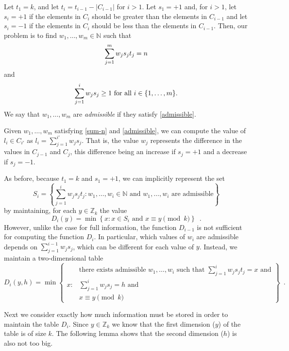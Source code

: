 \documentclass[lotsofwhite]{patmorin}
\newcommand{\Z}{\mathbb{Z}}
\newcommand{\N}{\mathbb{N}}
\begin{document}
Let $t_1=k$, and let $t_i = t_{i-1}-|C_{i-1}|$ for $i>1$.  Let
$s_1=+1$ and, for $i>1$, let $s_i=+1$ if the elements in $C_{i}$
should be greater than the elements in $C_{i-1}$ and let $s_{i}=-1$ if
the elements in $C_{i}$ should be less than the elements in $C_{i-1}$.
Then, our problem is to find $w_1,\ldots,w_m\in\N$ such
that
\begin{equation}
\sum_{j=1}^m w_js_jt_j = n \eqlabel{sum-n}
\end{equation}
and
\begin{equation}
\sum_{j=1}^i w_js_j \ge 1 \mbox{ for all $i\in\{1,\ldots,m\}$.}
\eqlabel{admissible}
\end{equation}
We say that $w_1,\ldots,w_m$ are \emph{admissible} if they satisfy
\eqref{admissible}.

Given $w_1,\ldots,w_m$ satisfying \eqref{sum-n} and
\eqref{admissible}, we can compute the value of $l_i\in C_{i'}$ as 
$l_i =\sum_{j=1}^{i'} w_js_j$.  That is, the value $w_j$ represents the
difference in the values in $C_{j-1}$ and $C_j$, this difference being
an increase if $s_j=+1$ and a decrease if $s_j=-1$.

As before, because $t_1=k$ and $s_1=+1$, we can implicitly represent
the set 
\[
   S_i = \left\{\sum_{j=1}^i w_js_jt_j : 
	\mbox{$w_1,\ldots,w_i\in\mathbb{N}$ and  
		$w_1,\ldots,w_i$ are admissible} \right\}
\]
by maintaining, for each $y\in \Z_k$ the value 
\[
   D_i(y) = \min\left\{x : \mbox{$x\in S_i$ and $x\equiv y\pmod{k}$} \right\}
    \enspace .
\]
However, unlike the case for full information, the function $D_{i-1}$
is not sufficient for computing the function $D_{i}$.  In particular,
which values of $w_i$ are admissible depends on
$\sum_{j=1}^{i-1}w_js_j$, which can be different for each value of $y$.
Instead, we maintain a two-dimensional table
\[
   D_i(y,h) = \min\left\{
    \begin{array}{ll}
          & \mbox{there exists admissible $w_1,\ldots,w_i$ such that
                                      $\sum_{j=1}^i w_js_jt_j = x$ and} \\
        x :  & \mbox{$\sum_{j=1}^i w_js_j = h$ and} \\
          & \mbox{$x\equiv y\pmod{k}$} 
    \end{array}
    \right\}
    \enspace .
\]

Next we consider exactly how much information must be stored in order
to maintain the table $D_i$. Since $y\in \mathbb{Z}_k$ we know that
the first dimension ($y$) of the table is of size $k$. The following
lemma shows that the second dimension ($h$) is also not too big.
\end{document}
